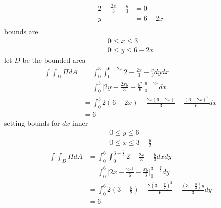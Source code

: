 \documentclass[10pt]{article}
\begin{document}
\begin{enumerate}
            \begin{align*}
                2-\frac{2x}{3} - \frac{y}{3} &= 0 \\
                y &= 6 - 2x \\
            \end{align*}
            bounds are
            \begin{align*}
                0 \leq x \leq 3 \\
                0 \leq y \leq 6 - 2x
            \end{align*}
            let $D$ be the bounded area
            \begin{align*}
                \int\int_D\Pi dA &= \int_0^3\int_0^{6-2x} 2-\frac{2x}{3} - \frac{y}{3} dydx \\
                &= \int_0^3\Big[2y-\frac{2xy}{3} - \frac{y^2}{6}\Big]_0^{6-2x} dx \\
                &= \int_0^3 2(6-2x)-\frac{2x(6-2x)}{3} - \frac{(6-2x)^2}{6} dx \\
                &= 6
            \end{align*}
            setting bounds for $dx$ inner
            \begin{align*}
                0 \leq y \leq 6 \\
                0 \leq x \leq 3 - \frac{y}{2}
            \end{align*}
            \begin{align*}
                \int\int_D\Pi dA &= \int_0^6\int_0^{3-\frac{y}{2}} 2-\frac{2x}{3} - \frac{y}{3} dxdy \\
                &= \int_0^6\Big[2x-\frac{2x^2}{6} - \frac{xy}{3}\Big]_0^{3-\frac{y}{2}} dy \\
                &= \int_0^6 2(3-\frac{y}{2})-\frac{2(3-\frac{y}{2})^2}{6} - \frac{(3-\frac{y}{2})y}{3}  dy \\
                &= 6
            \end{align*}
    \end{enumerate}
\end{document}
